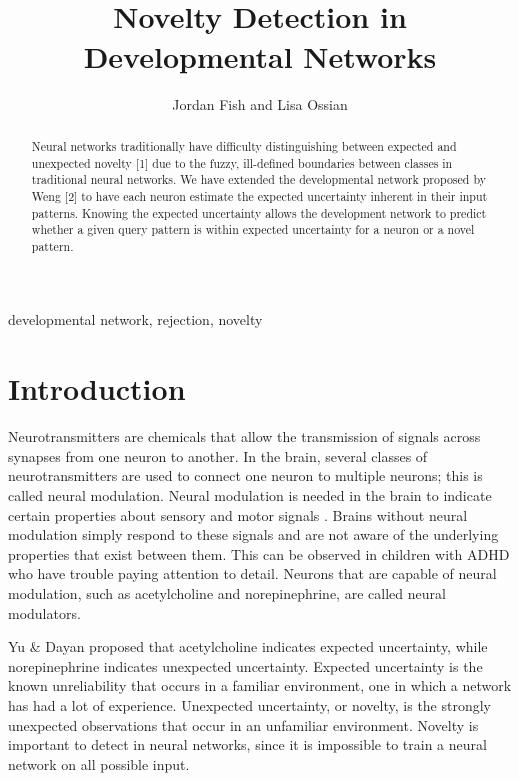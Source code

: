 \documentclass[conference]{IEEEtran}
\begin{document}
\title{\ \\ \LARGE\bf Novelty Detection in Developmental Networks}
\author{Jordan Fish and Lisa Ossian}
\maketitle

\begin{abstract}
Neural networks traditionally have difficulty distinguishing between expected and unexpected novelty [1] due to the fuzzy, ill-defined boundaries between classes in traditional neural networks. We have extended the developmental network proposed by Weng [2] to have each neuron estimate the expected uncertainty inherent in their input patterns. Knowing the expected uncertainty allows the development network to predict whether a given query pattern is within expected uncertainty for a neuron or a novel pattern.
\end{abstract}

\begin{IEEEkeywords}
developmental network, rejection, novelty
\end{IEEEkeywords}

\section{Introduction}
Neurotransmitters are chemicals that allow the transmission of signals across synapses from one neuron to another. In the brain, several classes of neurotransmitters are used to connect one neuron to multiple neurons; this is called neural modulation. Neural modulation is needed in the brain to indicate certain properties about
sensory and motor signals \cite{cit:2}. Brains without neural modulation simply
respond to these signals and are not aware of the underlying properties that exist between them. This can be observed in children with ADHD who have trouble paying attention to detail. Neurons that are capable of neural modulation, such as acetylcholine and norepinephrine, are called neural modulators.

Yu \& Dayan \cite{cit:1} proposed that acetylcholine indicates expected uncertainty, while norepinephrine indicates unexpected uncertainty. Expected uncertainty is the known unreliability that occurs in a familiar environment, one in which a network has had a lot of experience. Unexpected uncertainty, or novelty, is the strongly unexpected observations that occur in an unfamiliar environment. Novelty is important to detect in neural networks, since it is impossible to train a neural network on all possible input.
\end{document}
